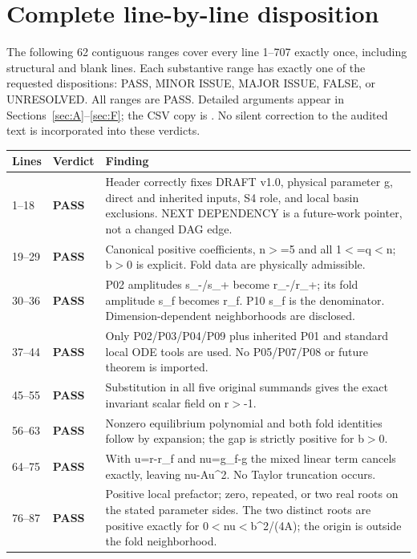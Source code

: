 \documentclass[11pt]{article}
\newcommand{\pass}{\textbf{PASS}}
\begin{document}
\section{Complete line-by-line disposition}
\label{sec:lines}
The following 62 contiguous ranges cover every line 1--707 exactly once,
including structural and blank lines. Each substantive range has exactly one
of the requested dispositions: PASS, MINOR ISSUE, MAJOR ISSUE, FALSE, or
UNRESOLVED. All ranges are PASS. Detailed arguments appear in
Sections~\ref{sec:A}--\ref{sec:F}; the CSV copy is
. No silent correction to the
audited text is incorporated into these verdicts.
\small
\begin{longtable}{@{}p{}p{}p{}@{}}
\toprule Lines&Verdict&Finding\\\midrule\endhead
1--18 & \pass & Header correctly fixes DRAFT v1.0, physical parameter g, direct and inherited inputs, S4 role, and local basin exclusions. NEXT DEPENDENCY is a future-work pointer, not a changed DAG edge.\\
19--29 & \pass & Canonical positive coefficients, n\ensuremath{>}=5 and all 1\ensuremath{<}=q\ensuremath{<}n; b\ensuremath{>}0 is explicit. Fold data are physically admissible.\\
30--36 & \pass & P02 amplitudes s\_-/s\_+ become r\_-/r\_+; its fold amplitude s\_f becomes r\_f. P10 s\_f is the denominator. Dimension-dependent neighborhoods are disclosed.\\
37--44 & \pass & Only P02/P03/P04/P09 plus inherited P01 and standard local ODE tools are used. No P05/P07/P08 or future theorem is imported.\\
45--55 & \pass & Substitution in all five original summands gives the exact invariant scalar field on r\ensuremath{>}-1.\\
56--63 & \pass & Nonzero equilibrium polynomial and both fold identities follow by expansion; the gap is strictly positive for b\ensuremath{>}0.\\
64--75 & \pass & With u=r-r\_f and nu=g\_f-g the mixed linear term cancels exactly, leaving nu-Au\textasciicircum{}2. No Taylor truncation occurs.\\
76--87 & \pass & Positive local prefactor; zero, repeated, or two real roots on the stated parameter sides. The two distinct roots are positive exactly for 0\ensuremath{<}nu\ensuremath{<}b\textasciicircum{}2/(4A); the origin is outside the fold neighborhood.\\

\end{longtable}
\end{document}
